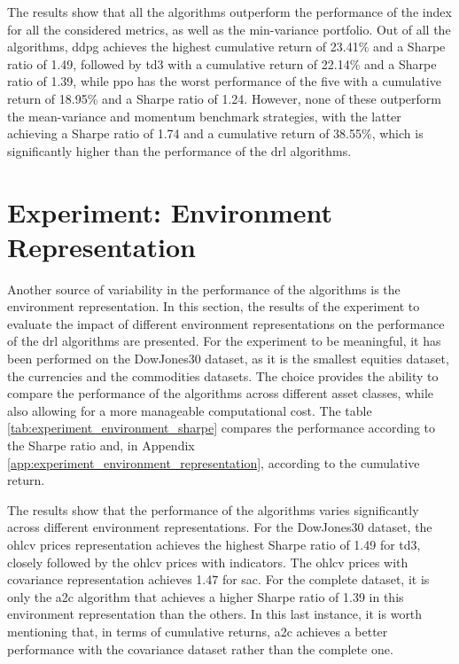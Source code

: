 

The results show that all the algorithms outperform the performance of the index for all the considered metrics, as well as the min-variance portfolio. Out of all the algorithms, \acrshort{ddpg} achieves the highest cumulative return of 23.41\% and a Sharpe ratio of 1.49, followed by \acrshort{td3} with a cumulative return of 22.14\% and a Sharpe ratio of 1.39, while \acrshort{ppo} has the worst performance of the five with a cumulative return of 18.95\% and a Sharpe ratio of 1.24. However, none of these outperform the mean-variance and momentum benchmark strategies, with the latter achieving a Sharpe ratio of 1.74 and a cumulative return of 38.55\%, which is significantly higher than the performance of the \acrshort{drl} algorithms.

\section{Experiment: Environment Representation} \label{sec:environment-representation}

Another source of variability in the performance of the algorithms is the environment representation. In this section, the results of the experiment to evaluate the impact of different environment representations on the performance of the \acrshort{drl} algorithms are presented. For the experiment to be meaningful, it has been performed on the DowJones30 dataset, as it is the smallest equities dataset, the currencies and the commodities datasets. The choice provides the ability to compare the performance of the algorithms across different asset classes, while also allowing for a more manageable computational cost. The table \ref{tab:experiment_environment_sharpe} compares the performance according to the Sharpe ratio and, in Appendix \ref{app:experiment_environment_representation}, according to the cumulative return.



The results show that the performance of the algorithms varies significantly across different environment representations. For the DowJones30 dataset, the \acrshort{ohlcv} prices representation achieves the highest Sharpe ratio of 1.49 for \acrshort{td3}, closely followed by the \acrshort{ohlcv} prices with indicators. The \acrshort{ohlcv} prices with covariance representation achieves 1.47 for \acrshort{sac}. For the complete dataset, it is only the \acrshort{a2c} algorithm that achieves a higher Sharpe ratio of 1.39 in this environment representation than the others. In this last instance, it is worth mentioning that, in terms of cumulative returns, \acrshort{a2c} achieves a better performance with the covariance dataset rather than the complete one.

